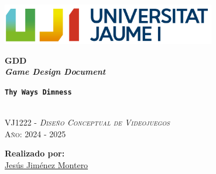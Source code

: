 \documentclass[12pt]{article}
\newcommand{\gameTitle}{\texttt{\textbf{Thy Ways Dimness}}\xspace}
\begin{document}
\pagecolor{pageColor}
\color{textColor}
\begin{titlepage}
    \vspace*{\fill}

    \centering
    \parbox{0.8\textwidth}{    %
        \includegraphics[width=0.7\textwidth]{Imagenes/marca-uji-color-fons-transparent.png}\par\vspace{1cm}

        {\Huge \bfseries GDD \\ \textit{Game Design Document} \par}
        {\Large \bfseries \gameTitle \par}

        \textsc{\large }
        \vspace{0.5cm} \\
        \textsc{\Large VJ1222 - \textit{Diseño Conceptual de Videojuegos}}
        \vspace{0.5cm} \\
        \textsc{\large Año: 2024 - 2025}
        \vfill

        \textbf{Realizado por:}         \\
        \href{https://www.richardotomislav.com/}{Jesús Jiménez Montero}      \\
    }
    \vspace*{\fill}
\end{titlepage}
\end{document}
